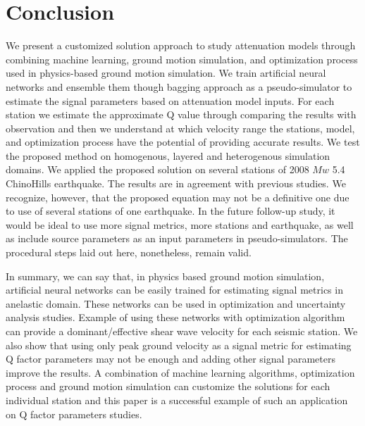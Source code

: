 \section{Conclusion}

We present a customized solution approach to study attenuation models through combining machine learning, ground motion simulation, and optimization process used in physics-based ground motion simulation. We train artificial neural networks and ensemble them though bagging approach as a pseudo-simulator to estimate the signal parameters based on attenuation model inputs. For each station we estimate the approximate Q value through comparing the results with observation and then we understand at which velocity range the stations, model, and optimization process have the potential of providing accurate results. We test the proposed method on homogenous, layered and heterogenous simulation domains. We applied the proposed solution on several stations of 2008 $Mw$ 5.4 ChinoHills earthquake. The results are in agreement with previous studies. We recognize, however, that the proposed equation may not be a definitive one due to use of several stations of one earthquake. In the future follow-up study, it would be ideal to use more signal metrics, more stations and earthquake, as well as include source parameters as an input parameters in pseudo-simulators. The procedural steps laid out here, nonetheless, remain valid.    

In summary, we can say that, in physics based ground motion simulation, artificial neural networks can be easily trained for estimating signal metrics in anelastic domain. These networks can be used in optimization and uncertainty analysis studies. Example of using these networks with optimization algorithm can provide a dominant/effective shear wave velocity for each seismic station. We also show that using only peak ground velocity as a signal metric for estimating Q factor parameters may not be enough and adding other signal parameters improve the results. A combination of machine learning algorithms, optimization process and ground motion simulation can customize the solutions for each individual station and this paper is a successful example of such an application on Q factor parameters studies. 




